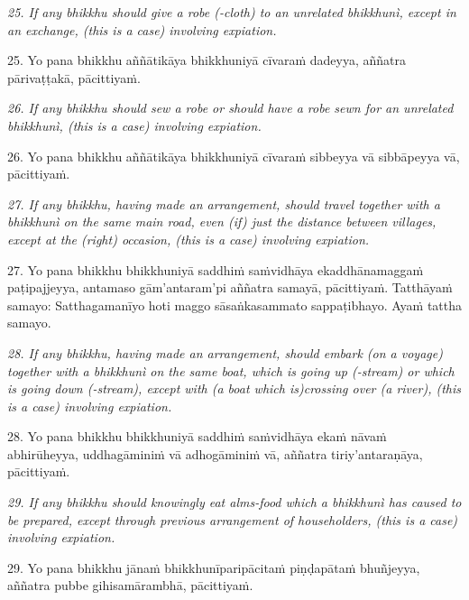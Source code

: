 \documentclass[11pt]{article}
\begin{document}
\begin{paracol}{2}
\begin{column}
{\itshape\footnotesize
25. If any bhikkhu should give a robe (-cloth) to an unrelated bhikkhunì, except in an exchange, (this is a case) involving expiation.
}
\switchcolumn

\begin{flushleft}
25. Yo pana bhikkhu aññātikāya bhikkhuniyā cīvaraṁ dadeyya, aññatra pārivaṭṭakā, pācittiyaṁ.
\switchcolumn*
\end{flushleft}

{\itshape\footnotesize
26. If any bhikkhu should sew a robe or should have a robe sewn for an unrelated bhikkhunì, (this is a case) involving expiation.
}
\switchcolumn

\begin{flushleft}
26. Yo pana bhikkhu aññātikāya bhikkhuniyā cīvaraṁ sibbeyya vā sibbāpeyya vā, pācittiyaṁ.
\switchcolumn*
\end{flushleft}

{\itshape\footnotesize
27. If any bhikkhu, having made an arrangement, should travel together with a bhikkhunì on the same main road, even (if) just the distance between villages, except at the (right) occasion, (this is a case) involving expiation.
}
\switchcolumn

\begin{flushleft}
27. Yo pana bhikkhu bhikkhuniyā saddhiṁ saṁvidhāya ekaddhānamaggaṁ paṭipajjeyya, antamaso gām’antaram’pi aññatra samayā, pācittiyaṁ. Tatthāyaṁ samayo: Satthagamanīyo hoti maggo sāsaṅkasammato sappaṭibhayo. Ayaṁ tattha samayo.
\switchcolumn*
\end{flushleft}

{\itshape\footnotesize
28. If any bhikkhu, having made an arrangement, should embark (on a voyage) together with a bhikkhunì on the same boat, which is going up (-stream) or which is going down (-stream), except with (a boat which is)crossing over (a river), (this is a case) involving expiation.
}
\switchcolumn

\begin{flushleft}
28. Yo pana bhikkhu bhikkhuniyā saddhiṁ saṁvidhāya ekaṁ nāvaṁ abhirūheyya, uddhagāminiṁ vā adhogāminiṁ vā, aññatra tiriy’antaraṇāya, pācittiyaṁ.
\switchcolumn*
\end{flushleft}

{\itshape\footnotesize
29. If any bhikkhu should knowingly eat alms-food which a bhikkhunì has caused to be prepared, except through previous arrangement of householders, (this is a case) involving expiation.
}
\switchcolumn

\begin{flushleft}
29. Yo pana bhikkhu jānaṁ bhikkhunīparipācitaṁ piṇḍapātaṁ bhuñjeyya, aññatra pubbe gihisamārambhā, pācittiyaṁ.
\switchcolumn*
\end{flushleft}


\end{column}
\end{paracol}
\end{document}
